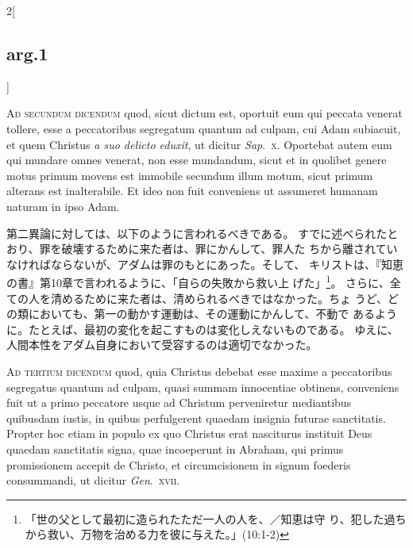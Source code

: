 \documentclass[paper=a4paper,fontsize=10pt,jafontsize=9pt,titlepage]{jlreq}
\begin{document}
\begin{paracol}{2}[\subsection{arg.1}]
\switchcolumn*[\subsection{ad.2}]

{\scshape Ad secundum dicendum} quod, sicut dictum est, oportuit eum qui peccata
venerat tollere, esse a peccatoribus segregatum quantum ad culpam, cui
Adam subiacuit, et quem Christus {\itshape a suo delicto eduxit}, ut dicitur
{\itshape Sap}.~{\scshape x}. Oportebat autem eum qui mundare omnes venerat, non esse
mundandum, sicut et in quolibet genere motus primum movens est immobile
secundum illum motum, sicut primum alterans est inalterabile. Et ideo
non fuit conveniens ut assumeret humanam naturam in ipso Adam.

\switchcolumn

第二異論に対しては、以下のように言われるべきである。
すでに述べられたとおり、罪を破壊するために来た者は、罪にかんして、罪人た
 ちから離されていなければならないが、アダムは罪のもとにあった。そして、
 キリストは、『知恵の書』第10章で言われるように、「自らの失敗から救い上
 げた」\footnote{「世の父として最初に造られたただ一人の人を、／知恵は守
 り、犯した過ちから救い、万物を治める力を彼に与えた。」(10:1-2)}。
さらに、全ての人を清めるために来た者は、清められるべきではなかった。ちょ
 うど、どの類においても、第一の動かす運動は、その運動にかんして、不動で
 あるように。たとえば、最初の変化を起こすものは変化しえないものである。
 ゆえに、人間本性をアダム自身において受容するのは適切でなかった。

\switchcolumn*[\subsection{ad.3}]

{\scshape Ad tertium dicendum} quod, quia Christus debebat esse maxime a
peccatoribus segregatus quantum ad culpam, quasi summam innocentiae
obtinens, conveniens fuit ut a primo peccatore usque ad Christum
perveniretur mediantibus quibusdam iustis, in quibus perfulgerent
quaedam insignia futurae sanctitatis. Propter hoc etiam in populo ex quo
Christus erat nasciturus instituit Deus quaedam sanctitatis signa, quae
incoeperunt in Abraham, qui primus promissionem accepit de Christo, et
circumcisionem in signum foederis consummandi, ut dicitur {\itshape Gen}.~{\scshape xvii}.

\switchcolumn


\end{paracol}
\end{document}
